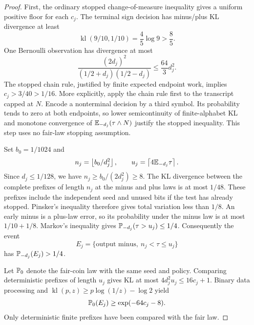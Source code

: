 \begin{proof}
First, the ordinary stopped change-of-measure inequality gives a uniform
positive floor for each $c_j$.  The terminal sign decision has minus/plus
KL divergence at least
\[
 \operatorname{kl}(9/10,1/10)=\frac45\log9>\frac85.
\]
One Bernoulli observation has divergence at most
\[
 \frac{(2d_j)^2}{(1/2+d_j)(1/2-d_j)}\le\frac{64}{3}d_j^2.
\]
The stopped chain rule, justified by finite expected endpoint work, implies
$c_j>3/40>1/16$. More explicitly, apply the chain rule first to
the transcript capped at $N$. Encode a nonterminal decision by a third
symbol. Its probability tends to zero at both endpoints, so lower
semicontinuity of finite-alphabet KL and monotone convergence of
$\mathbb E_{-d_j}(\tau\wedge N)$ justify the stopped inequality.
This step uses no fair-law stopping assumption.

Set $b_0=1/1024$ and
\[
 n_j=\left\lfloor b_0/d_j^2\right\rfloor,\qquad
 u_j=\left\lceil4\mathbb E_{-d_j}\tau\right\rceil.
\]
Since $d_j\le1/128$, we have $n_j\ge b_0/(2d_j^2)\ge8$.
The KL divergence between the complete prefixes of length $n_j$ at the
minus and plus laws is at most $1/48$.  These prefixes include the
independent seed and unused bits if the test has already stopped.
Pinsker's inequality therefore gives total variation less than $1/8$.
An early minus is a plus-law error, so its probability under the minus law
is at most $1/10+1/8$.  Markov's inequality gives
$\mathbb P_{-d_j}(\tau>u_j)\le1/4$.  Consequently the event
\[
 E_j=\{\text{output minus},\ n_j<\tau\le u_j\}
\]
has $\mathbb P_{-d_j}(E_j)>1/4$.

Let $\mathbb P_0$ denote the fair-coin law with the same seed and policy.
Comparing deterministic prefixes of length $u_j$ gives KL at most
$4d_j^2u_j\le16c_j+1$.  Binary data processing and
$\operatorname{kl}(p,z)\ge p\log(1/z)-\log2$ yield
\begin{equation}\label{eq:sc-window-mass}
 \mathbb P_0(E_j)\ge\exp(-64c_j-8).
\end{equation}
Only deterministic finite prefixes have been compared with the fair law.


\end{proof}
